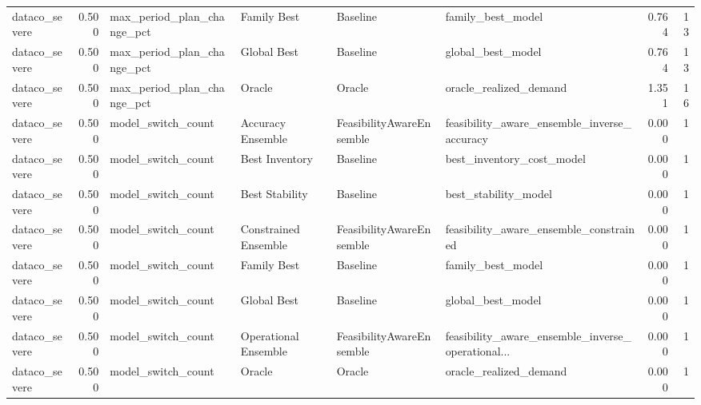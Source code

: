 \begin{table}
{\begin{tabular}{lrllllrr}
 dataco\_severe &             0.500 &  max\_period\_plan\_change\_pct &           Family Best &                  Baseline &                                  family\_best\_model &         0.764 &              13 \\
 dataco\_severe &             0.500 &  max\_period\_plan\_change\_pct &           Global Best &                  Baseline &                                  global\_best\_model &         0.764 &              13 \\
 dataco\_severe &             0.500 &  max\_period\_plan\_change\_pct &                Oracle &                    Oracle &                             oracle\_realized\_demand &         1.351 &              16 \\
 dataco\_severe &             0.500 &          model\_switch\_count &     Accuracy Ensemble &  FeasibilityAwareEnsemble &        feasibility\_aware\_ensemble\_inverse\_accuracy &         0.000 &               1 \\
 dataco\_severe &             0.500 &          model\_switch\_count &        Best Inventory &                  Baseline &                          best\_inventory\_cost\_model &         0.000 &               1 \\
 dataco\_severe &             0.500 &          model\_switch\_count &        Best Stability &                  Baseline &                               best\_stability\_model &         0.000 &               1 \\
 dataco\_severe &             0.500 &          model\_switch\_count &  Constrained Ensemble &  FeasibilityAwareEnsemble &             feasibility\_aware\_ensemble\_constrained &         0.000 &               1 \\
 dataco\_severe &             0.500 &          model\_switch\_count &           Family Best &                  Baseline &                                  family\_best\_model &         0.000 &               1 \\
 dataco\_severe &             0.500 &          model\_switch\_count &           Global Best &                  Baseline &                                  global\_best\_model &         0.000 &               1 \\
 dataco\_severe &             0.500 &          model\_switch\_count &  Operational Ensemble &  FeasibilityAwareEnsemble &  feasibility\_aware\_ensemble\_inverse\_operational... &         0.000 &               1 \\
 dataco\_severe &             0.500 &          model\_switch\_count &                Oracle &                    Oracle &                             oracle\_realized\_demand &         0.000 &               1 \\

\end{tabular}}
\end{table}
